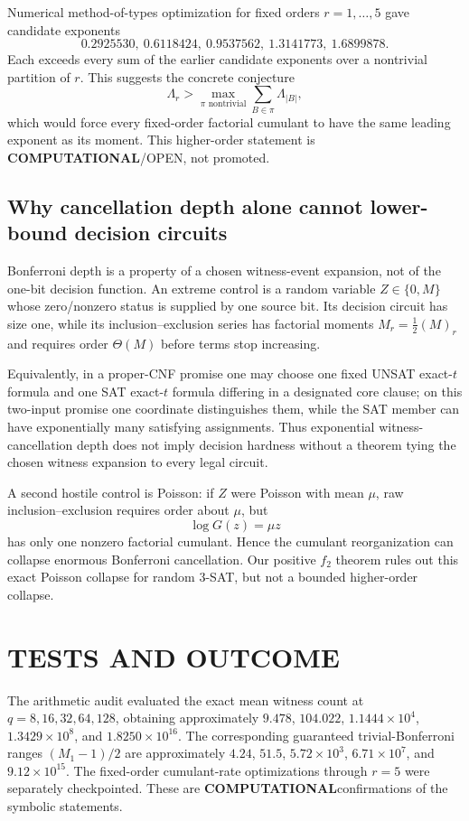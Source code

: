 \documentclass[11pt]{article}
\newcommand{\COMP}{\textbf{COMPUTATIONAL}}
\begin{document}
Numerical method-of-types optimization for fixed orders $r=1,\ldots,5$ gave candidate exponents
\[0.2925530,\ 0.6118424,\ 0.9537562,\ 1.3141773,\ 1.6899878.\]
Each exceeds every sum of the earlier candidate exponents over a nontrivial partition of $r$. This suggests the concrete conjecture
\[\Lambda_r>\max_{\pi\text{ nontrivial}}\sum_{B\in\pi}\Lambda_{|B|},\]
which would force every fixed-order factorial cumulant to have the same leading exponent as its moment. This higher-order statement is \COMP/OPEN, not promoted.

\subsection{Why cancellation depth alone cannot lower-bound decision circuits}
Bonferroni depth is a property of a chosen witness-event expansion, not of the one-bit decision function. An extreme control is a random variable $Z\in\{0,M\}$ whose zero/nonzero status is supplied by one source bit. Its decision circuit has size one, while its inclusion--exclusion series has factorial moments $M_r=\tfrac12(M)_r$ and requires order $\Theta(M)$ before terms stop increasing.

Equivalently, in a proper-CNF promise one may choose one fixed UNSAT exact-$t$ formula and one SAT exact-$t$ formula differing in a designated core clause; on this two-input promise one coordinate distinguishes them, while the SAT member can have exponentially many satisfying assignments. Thus exponential witness-cancellation depth does not imply decision hardness without a theorem tying the chosen witness expansion to every legal circuit.

A second hostile control is Poisson: if $Z$ were Poisson with mean $\mu$, raw inclusion--exclusion requires order about $\mu$, but
\[\log G(z)=\mu z\]
has only one nonzero factorial cumulant. Hence the cumulant reorganization can collapse enormous Bonferroni cancellation. Our positive $f_2$ theorem rules out this exact Poisson collapse for random 3-SAT, but not a bounded higher-order collapse.

\section{TESTS AND OUTCOME}
The arithmetic audit evaluated the exact mean witness count at $q=8,16,32,64,128$, obtaining approximately $9.478$, $104.022$, $1.1444\times10^4$, $1.3429\times10^8$, and $1.8250\times10^{16}$. The corresponding guaranteed trivial-Bonferroni ranges $(M_1-1)/2$ are approximately $4.24$, $51.5$, $5.72\times10^3$, $6.71\times10^7$, and $9.12\times10^{15}$. The fixed-order cumulant-rate optimizations through $r=5$ were separately checkpointed. These are \COMP confirmations of the symbolic statements.
\end{document}
